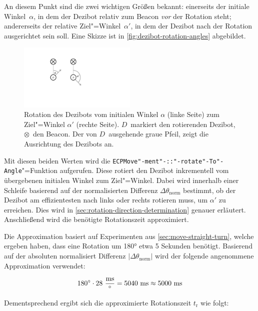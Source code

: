 {An diesem Punkt sind die zwei wichtigen Größen bekannt: einerseits der initiale Winkel~$\alpha$, in dem der Dezibot relativ zum Beacon \emph{vor} der Rotation steht; andererseits der relative Ziel"=Winkel~$\alpha'$, in dem der Dezibot nach der Rotation ausgerichtet sein soll. Eine Skizze ist in \autoref{fig:dezibot-rotation-angles} abgebildet.

\begin{figure}[h]
    \centering
    \includegraphics[width=0.5\textwidth]{../assets/dezibot_rotation_angles.pdf}
    \caption{Rotation des Dezibots vom initialen Winkel $\alpha$ (linke Seite) zum Ziel"=Winkel $\alpha'$ (rechte Seite). $D$~markiert den rotierenden Dezibot, $\otimes$~den Beacon. Der von $D$~ausgehende graue Pfeil, zeigt die Ausrichtung des Dezibots an.}
    \label{fig:dezibot-rotation-angles}
\end{figure}

Mit diesen beiden Werten wird die \texttt{ECPMove"-ment"-::"-rotate"-To"-Angle}"=Funktion aufgerufen. Diese rotiert den Dezibot inkrementell vom übergebenen initialen Winkel zum Ziel"=Winkel. Dabei wird innerhalb einer Schleife basierend auf der normalisierten Differenz $\Delta\theta_{\text{norm}}$ bestimmt, ob der Dezibot am effizientesten nach links oder rechts rotieren muss, um $\alpha'$ zu erreichen. Dies wird in \autoref{sec:rotation-direction-determination} genauer erläutert. Anschließend wird die benötigte Rotationszeit approximiert.

Die Approximation basiert auf Experimenten aus \autoref{sec:move-straight-turn}, welche ergeben haben, dass eine Rotation um 180° etwa 5 Sekunden benötigt. Basierend auf der absoluten normalisiert Differenz $\vert\Delta\theta_{\text{norm}}\vert$ wird der folgende angenommene Approximation verwendet:

\begin{equation*}
    180^\circ \cdot 28~\frac{\text{ms}}{^\circ} = 5040~\text{ms} \approx 5000~\text{ms}
\end{equation*}

Dementsprechend ergibt sich die approximierte Rotationszeit $t_{\text{r}}$ wie folgt:

}
